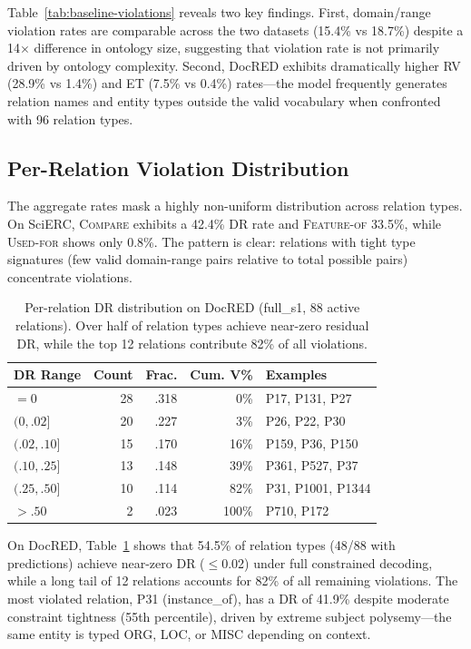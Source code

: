 \documentclass[11pt,a4paper]{article}
\begin{document}
Table~\ref{tab:baseline-violations} reveals two key findings.
First, domain/range violation rates are comparable across the two datasets (15.4\% vs 18.7\%) despite a 14$\times$ difference in ontology size, suggesting that violation rate is not primarily driven by ontology complexity.
Second, DocRED exhibits dramatically higher RV (28.9\% vs 1.4\%) and ET (7.5\% vs 0.4\%) rates---the model frequently generates relation names and entity types outside the valid vocabulary when confronted with 96 relation types.

\subsection{Per-Relation Violation Distribution}

The aggregate rates mask a highly non-uniform distribution across relation types.
On SciERC, \textsc{Compare} exhibits a 42.4\% DR rate and \textsc{Feature-of} 33.5\%, while \textsc{Used-for} shows only 0.8\%.
The pattern is clear: relations with tight type signatures (few valid domain-range pairs relative to total possible pairs) concentrate violations.

\begin{table}[t]
\centering
\small
\begin{tabular}{lrrrl}
\toprule
\textbf{DR Range} & \textbf{Count} & \textbf{Frac.} & \textbf{Cum. V\%} & \textbf{Examples} \\
\midrule
$= 0$ & 28 & .318 & 0\% & P17, P131, P27 \\
$(0, .02]$ & 20 & .227 & 3\% & P26, P22, P30 \\
$(.02, .10]$ & 15 & .170 & 16\% & P159, P36, P150 \\
$(.10, .25]$ & 13 & .148 & 39\% & P361, P527, P37 \\
$(.25, .50]$ & 10 & .114 & 82\% & P31, P1001, P1344 \\
$> .50$ & 2 & .023 & 100\% & P710, P172 \\
\bottomrule
\end{tabular}
\caption{Per-relation DR distribution on DocRED (full\_s1, 88 active relations). Over half of relation types achieve near-zero residual DR, while the top 12 relations contribute 82\% of all violations.}
\label{tab:docred-per-relation-dr}
\end{table}

On DocRED, Table~\ref{tab:docred-per-relation-dr} shows that 54.5\% of relation types (48/88 with predictions) achieve near-zero DR ($\leq$0.02) under full constrained decoding, while a long tail of 12 relations accounts for 82\% of all remaining violations.
The most violated relation, P31 (instance\_of), has a DR of 41.9\% despite moderate constraint tightness (55th percentile), driven by extreme subject polysemy---the same entity is typed ORG, LOC, or MISC depending on context.
\end{document}
